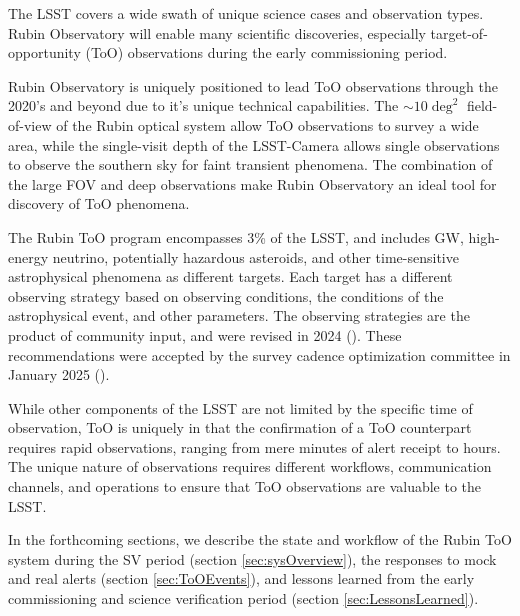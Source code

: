 The LSST covers a wide swath of unique science cases and observation types. Rubin Observatory will enable many scientific discoveries, especially target-of-opportunity (ToO) observations during the early commissioning period. 

Rubin Observatory is uniquely positioned to lead ToO observations through the 2020's and beyond due to it's unique technical capabilities. The $\sim10\deg^2$ field-of-view of the Rubin optical system allow ToO observations to survey a wide area, while the single-visit depth of the LSST-Camera allows single observations to observe the southern sky for faint transient phenomena. The combination of the large FOV and deep observations make Rubin Observatory an ideal tool for discovery of ToO phenomena.

The Rubin ToO program encompasses 3\% of the LSST, and includes GW, high-energy neutrino, potentially hazardous asteroids, and other time-sensitive astrophysical phenomena as different targets. Each target has a different observing strategy based on observing conditions, the conditions of the astrophysical event, and other parameters. The observing strategies are the product of community input, and were revised in 2024 (\cite{RubinToO2024}). These recommendations were accepted by the survey cadence optimization committee in January 2025 (\cite{PSTN-056}).

While other components of the LSST are not limited by the specific time of observation, ToO is uniquely in that the confirmation of a ToO counterpart requires rapid observations, ranging from mere minutes of alert receipt to hours. The unique nature of observations requires different workflows, communication channels, and operations to ensure that ToO observations are valuable to the LSST. 

In the forthcoming sections, we describe the state and workflow of the Rubin ToO system during the SV period (section \ref{sec:sysOverview}), the responses to mock and real alerts (section \ref{sec:ToOEvents}), and lessons learned from the early commissioning and science verification period (section \ref{sec:LessonsLearned}).